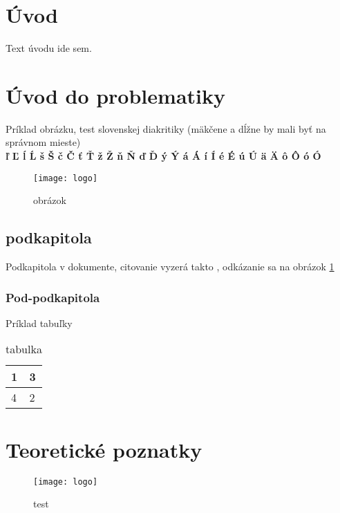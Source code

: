 \documentclass[12pt]{article}
\begin{document}


\newpage %
\tableofcontents
\newpage
\listoffigures
\newpage
\listoftables


\newpage
{}
\setcounter{page}{1} %
\section*{Úvod} %
\hspace{1.25cm}Text úvodu ide sem.

\newpage
\section{Úvod do problematiky}
Príklad obrázku, test slovenskej diakritiky (mäkčene a dĺžne by mali byť na správnom mieste) \\
\textbf{ľ Ľ ĺ Ĺ š Š č Č ť Ť ž Ž ň Ň ď Ď ý Ý á Á í Í é É ú Ú ä Ä ô Ô ó Ó}
\begin{figure}[H] %
\centering
\texttt{[image: logo]}
\caption{obrázok}
\label{img:obrazok}
\end{figure}
\subsection{podkapitola}
Podkapitola v dokumente, citovanie vyzerá takto \cite{modernrob}, odkázanie sa na obrázok \ref{img:obrazok}
\subsubsection{Pod-podkapitola}
Príklad tabuľky
\begin{table}[H]
	\centering
	\caption{tabulka}
	\label{tab:my-table}
	\begin{tabular}{|l|l|}
		\hline
		1 & 3 \\ \hline
		4 & 2 \\ \hline
	\end{tabular}
\end{table}
\section{Teoretické poznatky}
\begin{figure}[H] %
\centering
\texttt{[image: logo]}
\caption{test}
\label{img:test}
\end{figure}
\end{document}
